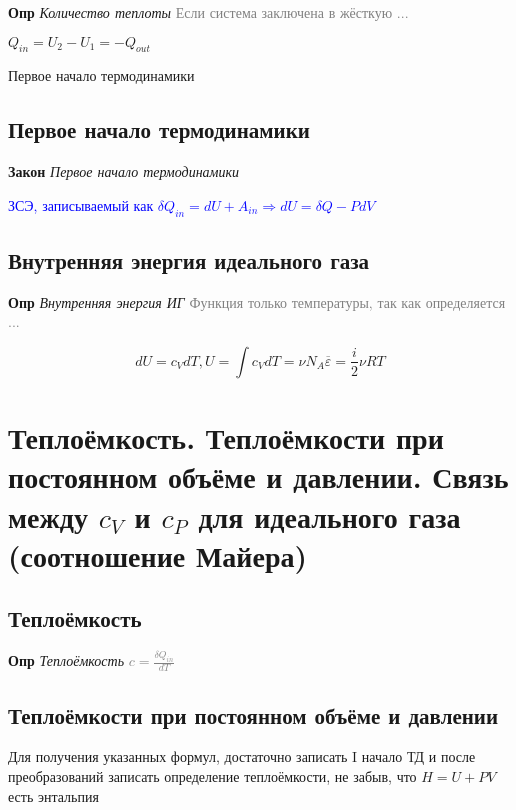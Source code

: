 \documentclass[a4paper, 14pt]{article}
\begin{document}

    \textbf{Опр} \textit{Количество теплоты} \textcolor{gray}{Если система заключена в жёсткую ...}

    $Q_{in} = U_2 - U_1 = -Q_{out}$

    Первое начало термодинамики

    \subsection{Первое начало термодинамики}

    \textbf{Закон} \textit{Первое начало термодинамики}

    \textcolor{blue}{ЗСЭ, записываемый как $\delta Q_{in} = dU + A_{in} \Rightarrow dU = \delta Q - PdV$}

    \subsection{Внутренняя энергия идеального газа}

    \textbf{Опр} \textit{Внутренняя энергия ИГ} \textcolor{gray}{Функция только температуры, так как определяется ...}

    \[ dU = c_V dT, U = \int c_V dT = \nu N_A \overline{\varepsilon} = \frac{i}{2} \nu RT \]

    \section{Теплоёмкость.
    Теплоёмкости при постоянном объёме и давлении.
    Связь между $c_V$ и $c_P$ для идеального газа (соотношение Майера)}

    \subsection{Теплоёмкость}

    \textbf{Опр} \textit{Теплоёмкость} \textcolor{gray}{$c = \frac{\delta Q_{in}}{dT}$}

    \subsection{Теплоёмкости при постоянном объёме и давлении}

    Для получения указанных формул, достаточно записать I начало ТД и после преобразований записать определение
    теплоёмкости, не забыв, что $H = U + PV$ есть энтальпия
\end{document}
